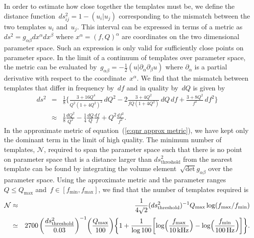 In order to estimate how close together the templates must be, we define
the distance function~$ds^2_{ij}=1-(u_i|u_j)$ corresponding to the mismatch
between the two templates $u_i$ and~$u_j$.  This interval can be expressed
in terms of a metric as~$ds^2=g_{\alpha\beta}dx^\alpha dx^\beta$ where
$x^\alpha=(f,Q)^\alpha$ are coordinates on the two dimensional parameter
space.  Such an expression is only valid for sufficiently close points on
parameter space.  In the limit of a continuum of templates over parameter
space, the metric can be evaluated
by~$g_{\alpha\beta}=-\frac{1}{2}(u|\partial_\alpha\partial_\beta u)$ where
$\partial_\alpha$ is a partial derivative with respect to the
coordinate~$x^\alpha$.  We find that the mismatch between templates that
differ in frequency by~$df$ and in quality by~$dQ$ is given by
\begin{eqnarray}
  ds^2 &=& \frac{1}{8} \biggl\{ \frac{3+16Q^4}{Q^2(1+4Q^2)^2}\,dQ^2
    - 2\frac{3+4Q^2}{fQ(1+4Q^2)}\,dQ\,df + \frac{3+8Q^2}{f^2}\,df^2 \biggr\}
    \label{e:qnr metric}\\
    &\approx& \frac{1}{8}\frac{dQ^2}{Q^2} - \frac{1}{4}\frac{dQ}{Q}\frac{df}{f}
    + Q^2\frac{df^2}{f^2}.
    \label{e:qnr approx metric}
\end{eqnarray}
In the approximate metric of equation~(\ref{e:qnr approx metric}), we have
kept only the dominant term in the limit of high quality.  The minimum number
of templates, $\mathcal{N}$, required to span the parameter space such that
there is no point on parameter space that is a distance larger than
$ds^2_{\mathrm{\scriptstyle threshold}}$ from the nearest template
can be found by integrating the
volume element~$\surd\det g_{\alpha\beta}$ over the parameter space.  Using
the approximate metric and the parameter
ranges~$Q\le Q_{\mathrm{\scriptstyle max}}$
and~$f\in[f_{\mathrm{\scriptstyle min}},f_{\mathrm{\scriptstyle max}}]$,
we find that the number of templates required is
\begin{eqnarray}
  {\mathcal{N}} &\approx& \frac{1}{4\surd2}
    (ds^2_{\mathrm{\scriptstyle threshold}})^{-1}
    Q_{\mathrm{\scriptstyle max}}
    \log(f_{\mathrm{\scriptstyle max}}/f_{\mathrm{\scriptstyle min}})
    \nonumber\\
  &\simeq& 2700\,
    \biggl(\frac{ds^2_{\mathrm{\scriptstyle threshold}}}{0.03}\biggr)^{-1}
    \biggl(\frac{Q_{\mathrm{\scriptstyle max}}}{100}\biggr)
    \biggl\{ 1 + \frac{1}{\log 100} \biggl[
    \log\Bigl(\frac{f_{\mathrm{\scriptstyle max}}}{10\,{\mathrm{kHz}}}\Bigr)
    - \log\Bigl(\frac{f_{\mathrm{\scriptstyle min}}}{100\,{\mathrm{Hz}}}\Bigr)
    \biggr]\biggr\}.
\end{eqnarray}

